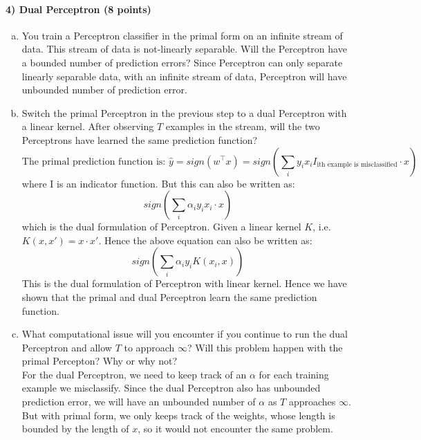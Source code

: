 \documentclass[11pt]{article}
\begin{document}
\paragraph{4) Dual Perceptron (8 points)} 
\begin{enumerate}[(a)]
\item You train a Perceptron classifier in the primal form on an infinite stream of data. This stream of data is not-linearly separable. Will the Perceptron have a bounded number of prediction errors?
Since Perceptron can only separate linearly separable data, with an infinite stream of data, Perceptron will have unbounded number of prediction error. 

\item Switch the primal Perceptron in the previous step to a dual Perceptron with a linear kernel. After observing $T$ examples in the stream, will the two Perceptrons have learned the same prediction function?
	\begin{equation*}
		\text {The primal prediction function is: } \hat{y} = sign(w^\top x) = sign(\sum_i y_i x_i I_{\text{ith example is misclassified}} \cdot x )
	\end{equation*}
where I is an indicator function.  But this can also be written as:
	\begin{equation*}
		sign(\sum_i \alpha_i y_i x_i \cdot x)
	\end{equation*}
which is the dual formulation of Perceptron. Given a linear kernel $K$, i.e. $K(x, x') = x \cdot x'$. Hence the above equation can also be written as:
	\begin{equation*}
		sign(\sum_i \alpha_i y_i K(x_i, x))
	\end{equation*}
This is the dual formulation of Perceptron with linear kernel. Hence we have shown that the primal and dual Perceptron learn the same prediction function.  

\item What computational issue will you encounter if you continue to run the dual Perceptron and allow $T$ to approach $\infty$? Will this problem happen with the primal Percepton? Why or why not?\\

For the dual Perceptron, we need to keep track of an $\alpha$ for each training example we misclassify. Since the dual Perceptron also has unbounded prediction error, we will have an unbounded number of $\alpha$ as $T$ approaches $\infty$. But with primal form, we only keeps track of the weights, whose length is bounded by the length of $x$, so it would not encounter the same problem. 

\end{enumerate}
\end{document}
